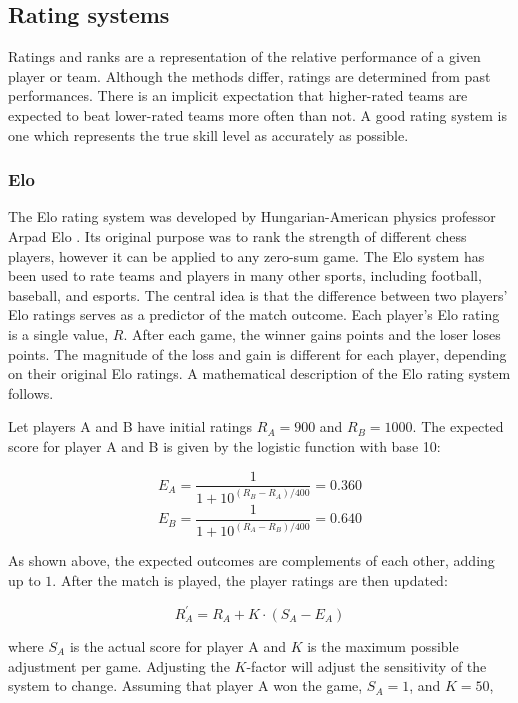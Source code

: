 \clearpage

\subsection{Rating systems}

Ratings and ranks are a representation of the relative performance of a given player or team. Although the methods differ, ratings are determined from past performances. There is an implicit expectation that higher-rated teams are expected to beat lower-rated teams more often than not. A good rating system is one which represents the true skill level as accurately as possible.

\subsubsection{Elo}
\label{elo}

The Elo rating system was developed by Hungarian-American physics professor Arpad Elo \cite{elo}. Its original purpose was to rank the strength of different chess players, however it can be applied to any zero-sum game. The Elo system has been used to rate teams and players in many other sports, including football, baseball, and esports. The central idea is that the difference between two players' Elo ratings serves as a predictor of the match outcome. Each player's Elo rating is a single value, $R$. After each game, the winner gains points and the loser loses points. The magnitude of the loss and gain is different for each player, depending on their original Elo ratings. A mathematical description of the Elo rating system follows. 

Let players A and B have initial ratings $R_A = 900$ and $R_B = 1000$. The expected score for player A and B is given by the logistic function with base 10:

\[ E_A = \frac{1}{1 + 10^{(R_B - R_A) / 400}} = 0.360 \]
\[ E_B = \frac{1}{1 + 10^{(R_A - R_B) / 400}} = 0.640 \]

As shown above, the expected outcomes are complements of each other, adding up to $1$. After the match is played, the player ratings are then updated:

\[ R_A^{'} = R_A + K \cdot (S_A - E_A) \]

where $S_A$ is the actual score for player A and $K$ is the maximum possible adjustment per game. Adjusting the $K$-factor will adjust the sensitivity of the system to change. Assuming that player A won the game, $S_A = 1$, and $K = 50$,

